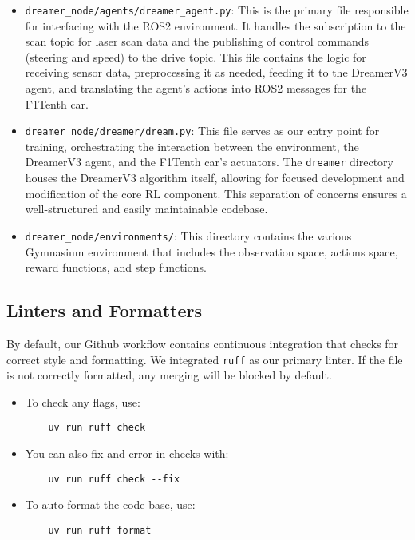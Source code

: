 \begin{itemize}
    \item \texttt{dreamer\_node/agents/dreamer\_agent.py}: This is the primary file responsible for interfacing with the ROS2 environment.  It handles the subscription to the scan topic for laser scan data and the publishing of control commands (steering and speed) to the drive topic.  This file contains the logic for receiving sensor data, preprocessing it as needed, feeding it to the DreamerV3 agent, and translating the agent's actions into ROS2 messages for the F1Tenth car.
    \item \texttt{dreamer\_node/dreamer/dream.py}: This file serves as our entry point for training, orchestrating the interaction between the environment, the DreamerV3 agent, and the F1Tenth car's actuators.  The \texttt{dreamer} directory houses the DreamerV3 algorithm itself, allowing for focused development and modification of the core RL component.  This separation of concerns ensures a well-structured and easily maintainable codebase.
    \item \texttt{dreamer\_node/environments/}: This directory contains the various Gymnasium environment that includes the observation space, actions space, reward functions, and step functions.
    
\end{itemize}

\subsection{Linters and Formatters}
By default, our Github workflow contains continuous integration that checks for correct style and formatting. We integrated \texttt{ruff} as our primary linter. If the file is not correctly formatted, any merging will be blocked by default.

\begin{itemize}
    \item To check any flags, use:
    \begin{verbatim}
    uv run ruff check
    \end{verbatim}
    \item You can also fix and error in checks with:
    \begin{verbatim}
    uv run ruff check --fix
    \end{verbatim}
    \item To auto-format the code base, use:
    \begin{verbatim}
    uv run ruff format
    \end{verbatim}
\end{itemize}


